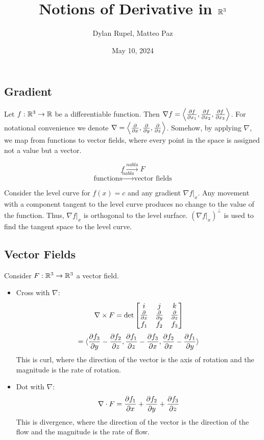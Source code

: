 \documentclass{article}
\author{Dylan Rupel, Matteo Paz}
\date{May 10, 2024}
\title{Notions of Derivative in $\mathbb{R}^3$}
\begin{document}
\maketitle
\subsection*{Gradient}
Let $f: \mathbb{R}^3 \to \mathbb{R}$ be a differentiable function. Then $\nabla f = \left\langle \frac{\partial f}{\partial x_1}, \frac{\partial f}{\partial x_2}, \frac{\partial f}{\partial x_3} \right\rangle$. For notational convenience we denote $\nabla = \left\langle \frac{\partial }{\partial x}, \frac{\partial }{\partial y}, \frac{\partial }{\partial z} \right\rangle$. Somehow, by applying $\nabla$, we map from functions to vector fields, where every point in the space is assigned not a value but a vector.

\[f \xrightarrow{nabla} F\]
\[\text{functions} \xrightarrow{nabla} \text{vector fields}\]

Consider the level curve for $f(x) = c$ and any gradient $\nabla f |_x$. Any movement with a component tangent to the level curve produces no change to the value of the function. Thus, $\nabla f |_x$ is orthogonal to the level surface. $(\nabla f|_x)^\perp$ is used to find the tangent space to the level curve. 

\subsection*{Vector Fields}

Consider $F: \mathbb{R}^3 \to \mathbb{R}^3$ a vector field.
\begin{itemize}
    \item Cross with $\nabla$:
        \[\nabla \times F = \det \begin{bmatrix}
            i & j & k \\
            \frac{\partial  }{\partial x} & \frac{\partial  }{\partial y} & \frac{\partial  }{\partial z} \\
            f_1 & f_2 & f_3
        \end{bmatrix}\]
        \[= \langle \frac{\partial f_3}{\partial y} - \frac{\partial f_2}{\partial z}, \frac{\partial f_1}{\partial z} - \frac{\partial f_3}{\partial x}, \frac{\partial f_2}{\partial x} - \frac{\partial f_1}{\partial y} \rangle \]
        This is curl, where the direction of the vector is the axis of rotation and the magnitude is the rate of rotation.
    \item Dot with $\nabla$:
        \[\nabla \cdot F = \frac{\partial f_1}{\partial x} + \frac{\partial f_2}{\partial y} + \frac{\partial f_3}{\partial z}\]
        This is divergence, where the direction of the vector is the direction of the flow and the magnitude is the rate of flow.

\end{itemize}
\end{document}
